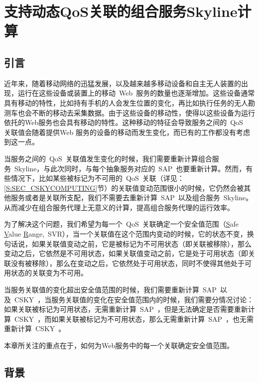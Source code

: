 \chapter{支持动态QoS关联的组合服务Skyline计算}

\section{引言}

近年来，随着移动网络的迅猛发展，以及越来越多移动设备和自主无人装置的出现，运行在这些设备或装置上的移动~Web~服务的数量也逐渐增加。这些设备通常具有移动的特性，比如持有手机的人会发生位置的变化，再比如执行任务的无人勘测车也会不断的移动去采集数据。由于这些设备的移动性，使得以这些设备为运行依托的Web服务也会具有移动的特性。这种移动的特征会导致服务之间的~QoS~ 关联值会随着提供Web 服务的设备的移动而发生变化，而已有的工作都没有考虑到这一点。

当服务之间的~QoS~关联值发生变化的时候，我们需要重新计算组合服务~Skyline，与此次同时，与每个抽象服务对应的~SAP~也要重新计算。然而，有些情况下，比如某些被标记为不可用的~QoS~关联（详见：\ref{S:SEC_CSKYCOMPUTING}节）的关联值变动范围很小的时候，它仍然会被其他服务或者是关联所支配，我们不需要去重新计算~SAP~以及组合服务~Skyline。 从而减少在组合服务代理上无意义的计算，提高组合服务代理的运行效率。

为了解决这个问题，我们希望为每一个~QoS~关联确定一个安全值范围（\underline{S}afe \underline{V}alue \underline{R}ange,~SVR），当一个关联值在这个范围内变动的时候，它的状态不变，换句话说，如果关联值变动之前，它是被标记为不可用状态（即关联被移除），那么变动之后，它依然是不可用状态，如果关联值变动之前，它是处于可用状态（即关联没有被移除），那么在变动之后，它依然处于可用状态，同时不使得其他处于可用状态的关联变为不可用。

当服务关联值的变化超出安全值范围的时候，我们需要重新计算~SAP~以及~CSKY~，当服务关联值的变化在安全值范围内的时候，我们需要分情况讨论：如果关联被标记为可用状态，无需重新计算~SAP~，但是无法确定是否需要重新计算~CSKY~，而如果关联被标记为不可用状态，那么无需重新计算~SAP~，也无需重新计算~CSKY~。

本章所关注的重点在于，如何为Web服务中的每一个关联确定安全值范围。

\section{背景}

